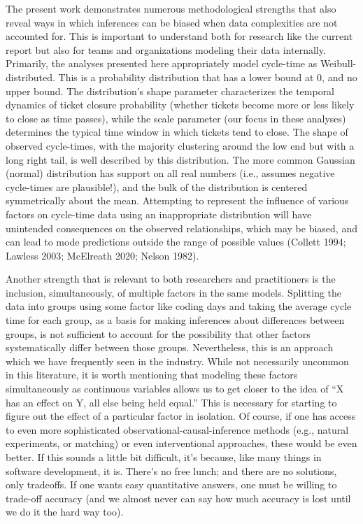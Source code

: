 \documentclass[
]{article}
\begin{document}
The present work demonstrates numerous methodological strengths that
also reveal ways in which inferences can be biased when data
complexities are not accounted for. This is important to understand both
for research like the current report but also for teams and
organizations modeling their data internally. Primarily, the analyses
presented here appropriately model cycle-time as Weibull-distributed.
This is a probability distribution that has a lower bound at 0, and no
upper bound. The distribution's shape parameter characterizes the
temporal dynamics of ticket closure probability (whether tickets become
more or less likely to close as time passes), while the scale parameter
(our focus in these analyses) determines the typical time window in
which tickets tend to close. The shape of observed cycle-times, with the
majority clustering around the low end but with a long right tail, is
well described by this distribution. The more common Gaussian (normal)
distribution has support on all real numbers (i.e., assumes negative
cycle-times are plausible!), and the bulk of the distribution is
centered symmetrically about the mean. Attempting to represent the
influence of various factors on cycle-time data using an inappropriate
distribution will have unintended consequences on the observed
relationships, which may be biased, and can lead to mode predictions
outside the range of possible values (Collett 1994; Lawless 2003;
McElreath 2020; Nelson 1982).

Another strength that is relevant to both researchers and practitioners
is the inclusion, simultaneously, of multiple factors in the same
models. Splitting the data into groups using some factor like coding
days and taking the average cycle time for each group, as a basis for
making inferences about differences between groups, is not sufficient to
account for the possibility that other factors systematically differ
between those groups. Nevertheless, this is an approach which we have
frequently seen in the industry. While not necessarily uncommon in this
literature, it is worth mentioning that modeling these factors
simultaneously as continuous variables allows us to get closer to the
idea of ``X has an effect on Y, all else being held equal.'' This is
necessary for starting to figure out the effect of a particular factor
in isolation. Of course, if one has access to even more sophisticated
observational-causal-inference methods (e.g., natural experiments, or
matching) or even interventional approaches, these would be even better.
If this sounds a little bit difficult, it's because, like many things in
software development, it is. There's no free lunch; and there are no
solutions, only tradeoffs. If one wants easy quantitative answers, one
must be willing to trade-off accuracy (and we almost never can say how
much accuracy is lost until we do it the hard way too).
\end{document}
